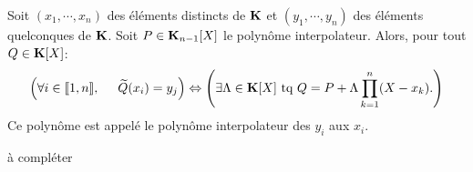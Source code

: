 \begin{prop}
 Soit $(x_1, \cdots, x_n)$ des éléments distincts de $\mathbf{K}$ et $(y_1,\cdots, y_n)$ des éléments quelconques de $\mathbf{K}$. Soit $P\in \mathbf{K}_{n-1}[X]$ le polynôme interpolateur. Alors, pour tout $Q\in \mathbf{K}[X]$:
\[
 \left( \forall i \in \llbracket 1,n \rrbracket,\hspace{0.5cm} \widetilde{Q}(x_i) = y_j\right) 
 \Leftrightarrow
 \left( \exists \Lambda \in \mathbf{K}[X] \text{ tq } Q = P + \Lambda \prod_{k=1}^n (X-x_k).
 \right) 
\]
Ce polynôme est appelé le polynôme interpolateur des $y_i$ aux $x_i$.
\end{prop} 
\begin{demo}
 à compléter
\end{demo}



